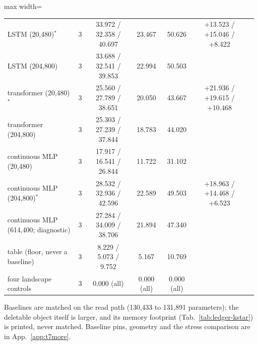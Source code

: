 \documentclass{article} %
\begin{document}
\begin{table}[t]
\begin{adjustbox}{max width=\linewidth}
\begin{tabular}{lcccccc}
LSTM (20,480)$^\ast$ & 3 & 33.972 / 32.358 / 40.697 & 23.467 & 50.626 & +13.523 / +15.046 / +8.422 & \\
LSTM (204,800) & 3 & 33.688 / 32.541 / 39.853 & 22.994 & 50.503 & & \\
transformer (20,480)$^\ast$ & 3 & 25.560 / 27.789 / 38.651 & 20.050 & 43.667 & +21.936 / +19.615 / +10.468 & \\
transformer (204,800) & 3 & 25.303 / 27.239 / 37.844 & 18.783 & 44.020 & & \\
continuous MLP (20,480) & 3 & 17.917 / 16.541 / 26.844 & 11.722 & 31.102 & & \\
continuous MLP (204,800)$^\ast$ & 3 & 28.532 / 32.936 / 42.596 & 22.589 & 49.503 & +18.963 / +14.468 / +6.523 & \\
continuous MLP (614,400; diagnostic) & 3 & 27.284 / 34.009 / 38.706 & 21.894 & 47.340 & & \\
table (floor, never a baseline) & 3 & 8.229 / 5.073 / 9.752 & 5.167 & 10.769 & & \\
\midrule
four landscape controls & 3 & 0.000 (all) & 0.000 (all) & 0.000 (all) & & \\
\bottomrule
\end{tabular}\end{adjustbox}
\end{table}


\noindent Baselines are matched on the read path (130,433 to 131,891 parameters); the deletable object
itself is larger, and its memory footprint (Tab.~\ref{tab:ledger-kstar}) is printed, never
matched. Baseline pins, geometry and the stress comparison are in App.~\ref{app:t7more}.

\end{document}

